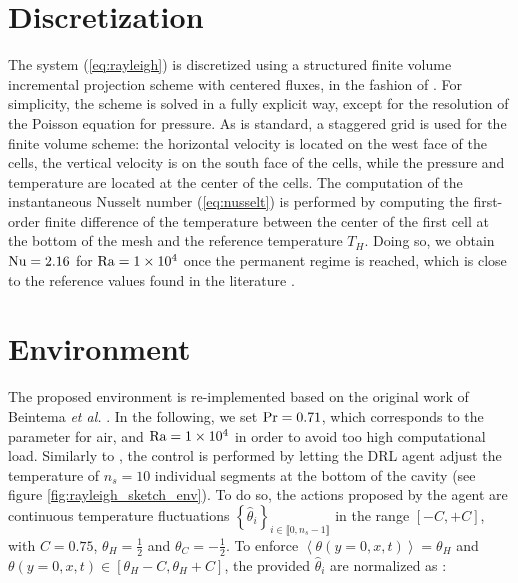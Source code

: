 

\section{Discretization}

The system (\ref{eq:rayleigh}) is discretized using a structured finite volume incremental projection scheme with centered fluxes, in the fashion of \cite{boivin2000}. For simplicity, the scheme is solved in a fully explicit way, except for the resolution of the Poisson equation for pressure. As is standard, a staggered grid is used for the finite volume scheme: the horizontal velocity is located on the west face of the cells, the vertical velocity is on the south face of the cells, while the pressure and temperature are located at the center of the cells. The computation of the instantaneous Nusselt number (\ref{eq:nusselt}) is performed by computing the first-order finite difference of the temperature between the center of the first cell at the bottom of the mesh and the reference temperature $T_H$. Doing so, we obtain $\text{Nu} = 2.16$  for $\text{Ra} = \num{1e4}$ once the permanent regime is reached, which is close to the reference values found in the literature \cite{ouertatani2008}.

\section{Environment}

The proposed environment is re-implemented based on the original work of Beintema \textit{et al.} \cite{beintema2020}. In the following, we set $\text{Pr}=0.71$, which corresponds to the parameter for air, and $\text{Ra} = \num{1e4}$ in order to avoid too high computational load. Similarly to \cite{beintema2020}, the control is performed by letting the DRL agent adjust the temperature of $n_s=10$ individual segments at the bottom of the cavity (see figure \ref{fig:rayleigh_sketch_env}). To do so, the actions proposed by the agent are continuous temperature fluctuations $\left\{ \hat{\theta}_i \right\}_{i \in \llbracket 0, n_s-1 \rrbracket}$ in the range $\left[-C, +C\right]$, with $C=0.75$, $\theta_H = \frac{1}{2}$ and $\theta_C = -\frac{1}{2}$. To enforce $\left< \theta(y=0,x,t) \right> = \theta_H$ and $\theta(y=0,x,t) \in \left[ \theta_H - C, \theta_H + C\right]$, the provided $\hat{\theta}_i$ are normalized as \cite{beintema2020}:


